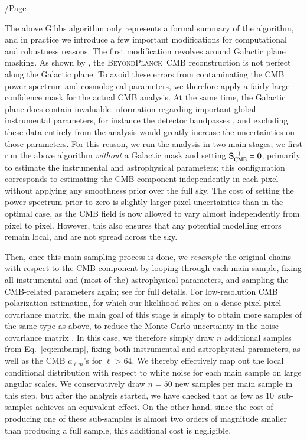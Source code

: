 /Page\documentclass[twocolumn]{aa}
\renewcommand{\S}[0]{\tens{S}}
\newcommand{\BP}{\textsc{BeyondPlanck}}
\begin{document}
The above Gibbs algorithm only represents a formal summary of the
algorithm, and in practice we introduce a few important modifications
for computational and robustness reasons. The first modification
revolves around Galactic plane masking. As shown by \citet{bp11}, the
\BP\ CMB reconstruction is not perfect along the Galactic plane. To
avoid these errors from contaminating the CMB power spectrum and
cosmological parameters, we therefore apply a fairly large confidence
mask for the actual CMB analysis. At the same time, the Galactic plane
does contain invaluable information regarding important global
instrumental parameters, for instance the detector bandpasses
\citep{bp09}, and excluding these data entirely from the analysis
would greatly increase the uncertainties on those parameters. For this
reason, we run the analysis in two main stages; we first run the above
algorithm \emph{without} a Galactic mask and setting
$\S_{\mathrm{CMB}}^{-1} = 0$, primarily to estimate the
instrumental and astrophysical parameters; this configuration
corresponds to estimating the CMB component independently in each
pixel without applying any smoothness prior over the full sky. The
cost of setting the power spectrum prior to zero is slightly larger
pixel uncertainties than in the optimal case, as the CMB field is now
allowed to vary almost independently from pixel to pixel. However,
this also ensures that any potential modelling errors remain local,
and are not spread across the sky.

Then, once this main sampling process is done, we \emph{resample} the
original chains with respect to the CMB component by looping through
each main sample, fixing all instrumental and (most of the)
astrophysical parameters, and sampling the CMB-related parameters
again; see \citet{bp11} for full details. For low-resolution CMB
polarization estimation, for which our likelihood relies on a dense
pixel-pixel covariance matrix, the main goal of this stage is simply
to obtain more samples of the same type as above, to reduce the Monte
Carlo uncertainty in the noise covariance matrix
\citep{sellentin2016}. In this case, we therefore simply draw $n$
additional samples from Eq.~\eqref{eq:cmbamp}, fixing both
instrumental and astrophysical parameters, as well as the CMB $a_{\ell
  m}$'s for $\ell>64$. We thereby effectively map out the local
conditional distribution with respect to white noise for each main sample
on large angular scales. We conservatively draw $n=50$ new samples per
main sample in this step, but after the analysis started, we have
checked that as few as 10~sub-samples achieves an equivalent
effect. On the other hand, since the cost of producing one of these
sub-samples is almost two orders of magnitude smaller than producing a
full sample, this additional cost is negligible.
\end{document}
